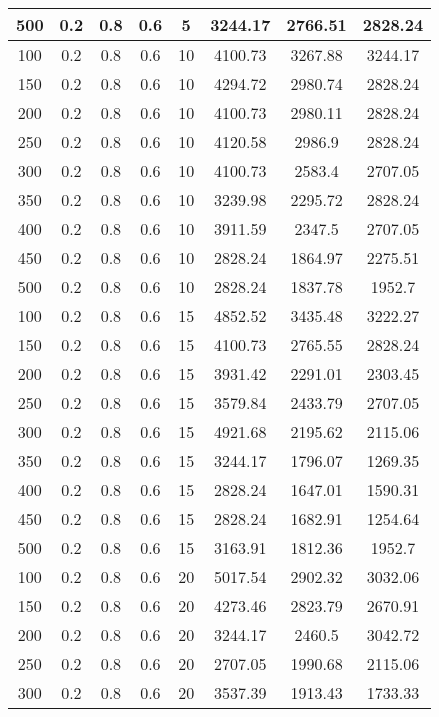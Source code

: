 \documentclass[a4paper, 12pt]{extreport}
\begin{document}
\begin{itemize}
\begin{longtable}{|c|c|c|c|c|c|c|c|}
			500 & 0.2 & 0.8 & 0.6 & 5 & 3244.17 & 2766.51 & 2828.24 \\\hline
			100 & 0.2 & 0.8 & 0.6 & 10 & 4100.73 & 3267.88 & 3244.17 \\\hline
			150 & 0.2 & 0.8 & 0.6 & 10 & 4294.72 & 2980.74 & 2828.24 \\\hline
			200 & 0.2 & 0.8 & 0.6 & 10 & 4100.73 & 2980.11 & 2828.24 \\\hline
			250 & 0.2 & 0.8 & 0.6 & 10 & 4120.58 & 2986.9 & 2828.24 \\\hline
			300 & 0.2 & 0.8 & 0.6 & 10 & 4100.73 & 2583.4 & 2707.05 \\\hline
			350 & 0.2 & 0.8 & 0.6 & 10 & 3239.98 & 2295.72 & 2828.24 \\\hline
			400 & 0.2 & 0.8 & 0.6 & 10 & 3911.59 & 2347.5 & 2707.05 \\\hline
			450 & 0.2 & 0.8 & 0.6 & 10 & 2828.24 & 1864.97 & 2275.51 \\\hline
			500 & 0.2 & 0.8 & 0.6 & 10 & 2828.24 & 1837.78 & 1952.7 \\\hline
			100 & 0.2 & 0.8 & 0.6 & 15 & 4852.52 & 3435.48 & 3222.27 \\\hline
			150 & 0.2 & 0.8 & 0.6 & 15 & 4100.73 & 2765.55 & 2828.24 \\\hline
			200 & 0.2 & 0.8 & 0.6 & 15 & 3931.42 & 2291.01 & 2303.45 \\\hline
			250 & 0.2 & 0.8 & 0.6 & 15 & 3579.84 & 2433.79 & 2707.05 \\\hline
			300 & 0.2 & 0.8 & 0.6 & 15 & 4921.68 & 2195.62 & 2115.06 \\\hline
			350 & 0.2 & 0.8 & 0.6 & 15 & 3244.17 & 1796.07 & 1269.35 \\\hline
			400 & 0.2 & 0.8 & 0.6 & 15 & 2828.24 & 1647.01 & 1590.31 \\\hline
			450 & 0.2 & 0.8 & 0.6 & 15 & 2828.24 & 1682.91 & 1254.64 \\\hline
			500 & 0.2 & 0.8 & 0.6 & 15 & 3163.91 & 1812.36 & 1952.7 \\\hline
			100 & 0.2 & 0.8 & 0.6 & 20 & 5017.54 & 2902.32 & 3032.06 \\\hline
			150 & 0.2 & 0.8 & 0.6 & 20 & 4273.46 & 2823.79 & 2670.91 \\\hline
			200 & 0.2 & 0.8 & 0.6 & 20 & 3244.17 & 2460.5 & 3042.72 \\\hline
			250 & 0.2 & 0.8 & 0.6 & 20 & 2707.05 & 1990.68 & 2115.06 \\\hline
			300 & 0.2 & 0.8 & 0.6 & 20 & 3537.39 & 1913.43 & 1733.33 \\\hline

\end{longtable}
\end{itemize}
\end{document}
